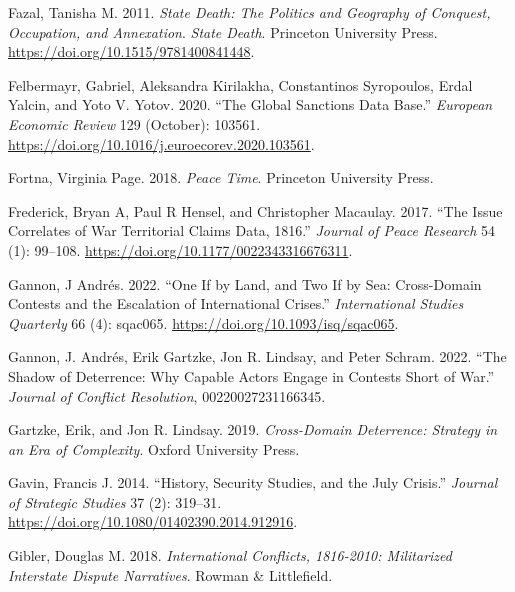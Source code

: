 \documentclass{article}
\newlength{\cslhangindent}
\newlength{\cslentryspacingunit} %
\newenvironment{CSLReferences}[2] %
 {%
  \setlength{\parindent}{0pt}
  \ifodd #1
  \let\oldpar\par
  \def\par{\hangindent=\cslhangindent\oldpar}
  \fi
  \setlength{\parskip}{#2\cslentryspacingunit}
 }%
 {}
\begin{document}
\begin{CSLReferences}{1}{0}
\leavevmode{}%
Fazal, Tanisha M. 2011. \emph{State {Death}: {The Politics} and
{Geography} of {Conquest}, {Occupation}, and {Annexation}}. \emph{State
Death}. {Princeton University Press}.
\url{https://doi.org/10.1515/9781400841448}.

\leavevmode{}%
Felbermayr, Gabriel, Aleksandra Kirilakha, Constantinos Syropoulos,
Erdal Yalcin, and Yoto V. Yotov. 2020. {``The Global Sanctions Data
Base.''} \emph{European Economic Review} 129 (October): 103561.
\url{https://doi.org/10.1016/j.euroecorev.2020.103561}.

\leavevmode{}%
Fortna, Virginia Page. 2018. \emph{Peace Time}. {Princeton University
Press}.

\leavevmode{}%
Frederick, Bryan A, Paul R Hensel, and Christopher Macaulay. 2017.
{``The {Issue Correlates} of {War Territorial Claims Data},
1816.''} \emph{Journal of Peace Research} 54 (1):
99--108. \url{https://doi.org/10.1177/0022343316676311}.

\leavevmode{}%
Gannon, J Andrés. 2022. {``One If by {Land}, and {Two} If by {Sea}:
{Cross-Domain Contests} and the {Escalation} of {International
Crises}.''} \emph{International Studies Quarterly} 66 (4): sqac065.
\url{https://doi.org/10.1093/isq/sqac065}.

\leavevmode{}%
Gannon, J. Andrés, Erik Gartzke, Jon R. Lindsay, and Peter Schram. 2022.
{``The {Shadow} of {Deterrence}: {Why Capable Actors Engage} in
{Contests Short} of {War}.''} \emph{Journal of Conflict Resolution},
00220027231166345.

\leavevmode{}%
Gartzke, Erik, and Jon R. Lindsay. 2019. \emph{Cross-{Domain
Deterrence}: {Strategy} in an {Era} of {Complexity}}. {Oxford University
Press}.

\leavevmode{}%
Gavin, Francis J. 2014. {``History, {Security Studies}, and the {July
Crisis}.''} \emph{Journal of Strategic Studies} 37 (2): 319--31.
\url{https://doi.org/10.1080/01402390.2014.912916}.

\leavevmode{}%
Gibler, Douglas M. 2018. \emph{International {Conflicts}, 1816-2010:
{Militarized Interstate Dispute Narratives}}. {Rowman \& Littlefield}.


\end{CSLReferences}
\end{document}
